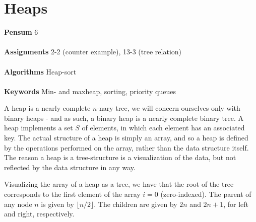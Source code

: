 
\chapter{Heaps}
\label{ch:heaps}

\textbf{Pensum} 6 \cite{clrs} \\\\
\textbf{Assignments} 2-2 (counter example), 13-3 (tree relation) \\\\
\textbf{Algorithms} Heap-sort \\\\
\textbf{Keywords} Min- and maxheap, sorting, priority queues
\vspace{1in}

\noindent A heap is a nearly complete $n$-nary tree, we will concern ourselves
only with binary heaps - and as such, a binary heap is a nearly complete
binary tree. A heap implements a set $S$ of elements, in which each element
has an associated key. The actual structure of a heap is simply an array, and
so a heap is defined by the operations performed on the array, rather than the
data structure itself. The reason a heap is a tree-structure is a
visualization of the data, but not reflected by the data structure in any way.

Visualizing the array of a heap as a tree, we have that the root of the tree
corresponds to the first element of the array $i = 0$ (zero-indexed). The
parent of any node $n$ is given by $\lfloor n/2 \rfloor$. The children are
given by $2n$ and $2n + 1$, for left and right, respectively.

